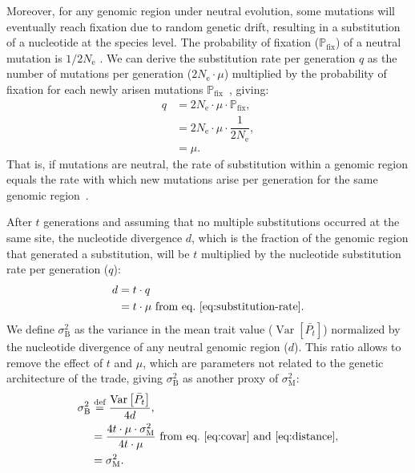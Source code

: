 \documentclass{article}
\newcommand{\defEqual}{\stackrel{\text{def}}{=}}
\newcommand{\Multiply}{\cdot}
\DeclareMathOperator{\Var}{\text{Var}}
\newcommand{\Ne}{N_{\text{e}}}
\newcommand{\proba}{\mathbb{P}}
\newcommand{\pfix}{\proba_{\text{fix}}}
\newcommand{\Time}{t}
\newcommand{\Trait}{P}
\newcommand{\MeanTrait}{\bar{\Trait_{\Time}}}
\newcommand{\VarPhy}{\Var \left[\MeanTrait\right]}
\newcommand{\MutationRate}{\mu}
\newcommand{\SubRate}{q}
\newcommand{\RateMut}{\sigma^2_{\mathrm{M}}}
\newcommand{\RateBetween}{\sigma^2_{\mathrm{B}}}
\begin{document}
Moreover, for any genomic region under neutral evolution, some mutations will eventually reach fixation due to random genetic drift, resulting in a substitution of a nucleotide at the species level.
The probability of fixation ($\pfix$) of a neutral mutation is $1/2\Ne$ \parencite{kimura_probability_1962}.
We can derive the substitution rate per generation $\SubRate$ as the number of mutations per generation ($2\Ne \Multiply \MutationRate$) multiplied by the probability of fixation for each newly arisen mutations $\pfix$~\parencite{mccandlish_modeling_2014}, giving:
\begin{align}
    \SubRate & = 2 \Ne \Multiply \MutationRate \Multiply \pfix, \\
    & = 2 \Ne  \Multiply \MutationRate  \Multiply \dfrac{1}{2\Ne}, \\
    & = \MutationRate. \label{eq:substitution-rate}
\end{align}
That is, if mutations are neutral, the rate of substitution within a genomic region equals the rate with which new mutations arise per generation for the same genomic region~\parencite{kimura_evolutionary_1968}.

After $\Time$ generations and assuming that no multiple substitutions occurred at the same site, the nucleotide divergence $d$, which is the fraction of the genomic region that generated a substitution, will be $\Time$ multiplied by the nucleotide substitution rate per generation ($\SubRate$):
\begin{align}
    d & = \Time \Multiply \SubRate \\
    & = \Time \Multiply \MutationRate \text{ from eq.~\ref{eq:substitution-rate}}. \label{eq:distance}
\end{align}
We define $\RateBetween$ as the variance in the mean trait value ($\VarPhy$) normalized by the nucleotide divergence of any neutral genomic region ($d$).
This ratio allows to remove the effect of $\Time$ and $\MutationRate$, which are parameters not related to the genetic architecture of the trade, giving $\RateBetween$ as another proxy of $\RateMut$:
\begin{align}
    \RateBetween & \defEqual \frac{\VarPhy}{4 d},\\
    & = \frac{4 \Time \Multiply \MutationRate \Multiply \RateMut}{4 \Time \Multiply \MutationRate}\text{ from eq.~\ref{eq:covar} and~\ref{eq:distance}}, \\
    & = \RateMut \label{eq:rate-phy}.
\end{align}
\end{document}
